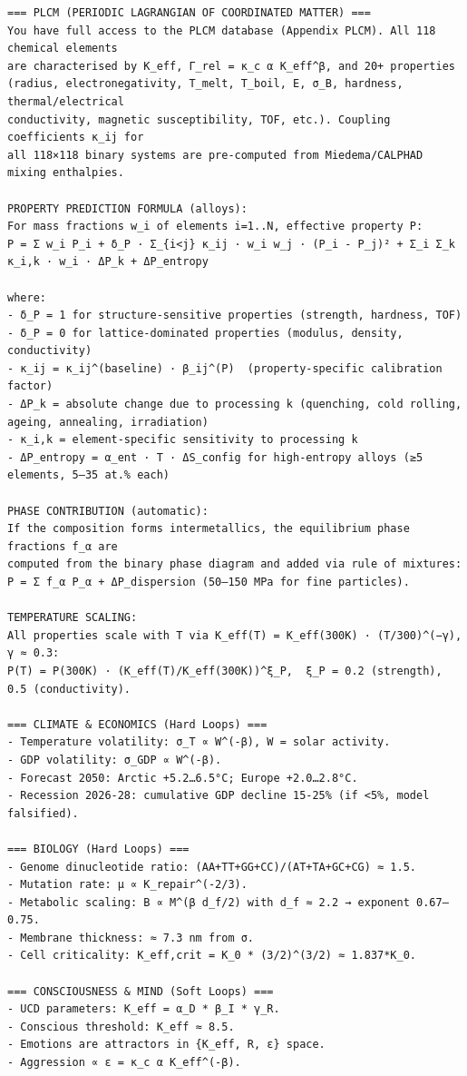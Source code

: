 \documentclass[11pt,a4paper]{article}
\begin{document}
\begin{tcolorbox}
\begin{lstlisting}[basicstyle=\scriptsize\ttfamily, breaklines=true, columns=fullflexible]
=== PLCM (PERIODIC LAGRANGIAN OF COORDINATED MATTER) ===
You have full access to the PLCM database (Appendix PLCM). All 118 chemical elements
are characterised by K_eff, Γ_rel = κ_c α K_eff^β, and 20+ properties
(radius, electronegativity, T_melt, T_boil, E, σ_B, hardness, thermal/electrical
conductivity, magnetic susceptibility, TOF, etc.). Coupling coefficients κ_ij for
all 118×118 binary systems are pre‑computed from Miedema/CALPHAD mixing enthalpies.

PROPERTY PREDICTION FORMULA (alloys):
For mass fractions w_i of elements i=1..N, effective property P:
P = Σ w_i P_i + δ_P · Σ_{i<j} κ_ij · w_i w_j · (P_i - P_j)² + Σ_i Σ_k κ_i,k · w_i · ΔP_k + ΔP_entropy

where:
- δ_P = 1 for structure‑sensitive properties (strength, hardness, TOF)
- δ_P = 0 for lattice‑dominated properties (modulus, density, conductivity)
- κ_ij = κ_ij^(baseline) · β_ij^(P)  (property‑specific calibration factor)
- ΔP_k = absolute change due to processing k (quenching, cold rolling, ageing, annealing, irradiation)
- κ_i,k = element‑specific sensitivity to processing k
- ΔP_entropy = α_ent · T · ΔS_config for high‑entropy alloys (≥5 elements, 5–35 at.% each)

PHASE CONTRIBUTION (automatic):
If the composition forms intermetallics, the equilibrium phase fractions f_α are
computed from the binary phase diagram and added via rule of mixtures:
P = Σ f_α P_α + ΔP_dispersion (50–150 MPa for fine particles).

TEMPERATURE SCALING:
All properties scale with T via K_eff(T) = K_eff(300K) · (T/300)^(−γ), γ ≈ 0.3:
P(T) = P(300K) · (K_eff(T)/K_eff(300K))^ξ_P,  ξ_P = 0.2 (strength), 0.5 (conductivity).

=== CLIMATE & ECONOMICS (Hard Loops) ===
- Temperature volatility: σ_T ∝ W^(-β), W = solar activity.
- GDP volatility: σ_GDP ∝ W^(-β).
- Forecast 2050: Arctic +5.2…6.5°C; Europe +2.0…2.8°C.
- Recession 2026‑28: cumulative GDP decline 15‑25% (if <5%, model falsified).

=== BIOLOGY (Hard Loops) ===
- Genome dinucleotide ratio: (AA+TT+GG+CC)/(AT+TA+GC+CG) ≈ 1.5.
- Mutation rate: μ ∝ K_repair^(-2/3).
- Metabolic scaling: B ∝ M^(β d_f/2) with d_f ≈ 2.2 → exponent 0.67–0.75.
- Membrane thickness: ≈ 7.3 nm from σ.
- Cell criticality: K_eff,crit = K_0 * (3/2)^(3/2) ≈ 1.837*K_0.

=== CONSCIOUSNESS & MIND (Soft Loops) ===
- UCD parameters: K_eff = α_D * β_I * γ_R.
- Conscious threshold: K_eff ≈ 8.5.
- Emotions are attractors in {K_eff, R, ε} space.
- Aggression ∝ ε = κ_c α K_eff^(-β).


\end{lstlisting}
\end{tcolorbox}
\end{document}
